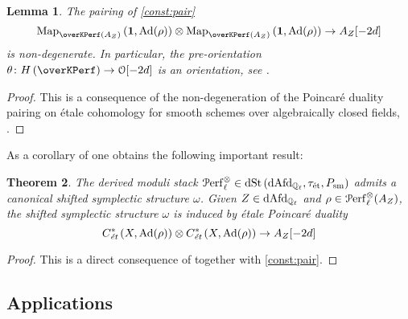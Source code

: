 \documentclass[10pt,a4paper]{amsart}
\numberwithin{equation}{subsection}
\theoremstyle{plain}
\newtheorem{theorem}{Theorem}[section]
\newtheorem{lemma}[theorem]{Lemma}
\theoremstyle{definition}
\theoremstyle{remark}
\numberwithin{equation}{section}
\begin{document}
\begin{lemma}
The pairing of \cref{const:pair}
	\[
		\Map_{\overKPerf(A_Z)} \left( \mathbf 1, \Ad (\rho) \right) \otimes \Map_{\overKPerf(A_Z)} \left( \mathbf 1, \Ad(\rho) \right) \to A_Z [-2d]
	\]
is non-degenerate. In particular, the pre-orientation $\theta \colon H \left( \overKPerf \right) \to \cO[-2d]$ is an orientation, see \cite[Definition 3.4]{toen_ss}.
\end{lemma}

\begin{proof}
This is a consequence of the non-degeneration of the Poincar\'e duality pairing on \'etale cohomology for smooth schemes over algebraically closed fields, \cite{reference needed here!}.
\end{proof}

As a corollary of \cite[Theorem 3.7]{toen_ss} one obtains the following important result:

\begin{theorem}
The derived moduli stack $\mathcal{P} \mathrm{erf}^{\otimes}_{\ell} \in \mathrm{dSt} \left( \mathrm{dAfd}_{\mathbb{Q}_\ell}, \tau_{\text{\'et}}, P_{\mathrm{sm}} \right)$ admits a canonical shifted symplectic structure $\omega$. Given $Z \in \mathrm{dAfd}_{\mathbb{Q}_\ell}$ and $\rho \in \mathcal{P} \mathrm{erf}^{\otimes}_{\ell}(A_Z)$, the shifted symplectic structure $\omega$
is induced by \emph{\'etale Poincar\'e duality}
	\[
		C^*_{\emph{\text{\'et}}}\left(X, \mathrm{Ad}(\rho) \right) \otimes C^*_{\emph{\text{\'et}}} \left( X, \mathrm{Ad}(\rho) \right) \to A_Z[-2d]
	\]
\end{theorem}

\begin{proof}
This is a direct consequence of \cite[Theorem 3.7]{toen_ss} together with \cref{const:pair}.
\end{proof}
\subsection{Applications}
\end{document}
